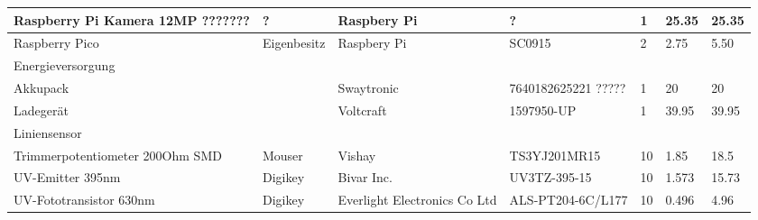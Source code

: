 \documentclass[main.tex]{subfiles} %
\begin{document}
\begin{table}[htbp]
{\begin{tabular}{|p{3cm}|p{2.5cm}|p{2.5cm}|p{3cm}|p{1cm}|p{1.5cm}|p{1cm}|}
            Raspberry Pi Kamera 12MP ???????        & ?                  & Raspbery Pi                  & ?                       & 1               & 25.35                     & 25.35                       \\ \hline
            Raspberry Pico                          & Eigenbesitz        & Raspbery Pi                  & SC0915                  & 2               & 2.75                      & 5.50                        \\ \hline
            \rowcolor{lightgray} Energieversorgung  &                    &                              &                         &                 &                           &                                 \\ \hline
            Akkupack                                &                    & Swaytronic                   & 7640182625221 ?????     & 1               & 20                        & 20                        \\ \hline
            Ladegerät                               &                    & Voltcraft                    & 1597950-UP              & 1               & 39.95                     & 39.95                           \\ \hline
            \rowcolor{lightgray} Liniensensor       &                    &                              &                         &                 &                           &                             \\ \hline
            Trimmerpotentiometer 200Ohm SMD         & Mouser             & Vishay                       & TS3YJ201MR15            & 10              & 1.85                      & 18.5                        \\ \hline
            UV-Emitter 395nm                        & Digikey            & Bivar Inc.                   & UV3TZ-395-15            & 10              & 1.573                     & 15.73                       \\ \hline
            UV-Fototransistor 630nm                 & Digikey            & Everlight Electronics Co Ltd & ALS-PT204-6C/L177       & 10              & 0.496                     & 4.96                        \\ \hline

\end{tabular}}
\end{table}
\end{document}

